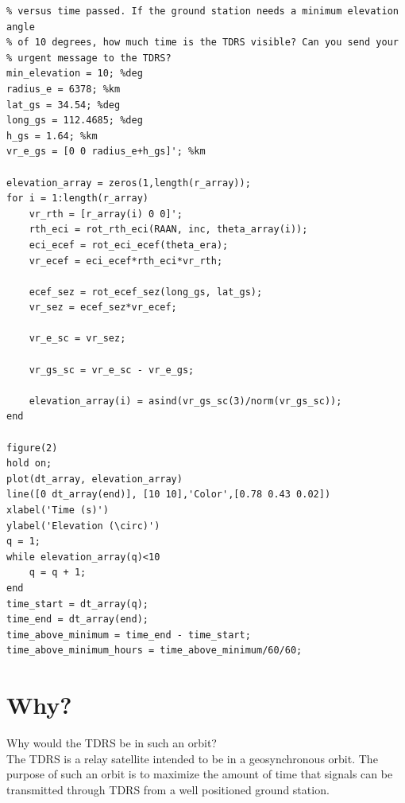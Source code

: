 \documentclass[hidelinks,12pt]{article}
\begin{document}
\begin{flushleft}
\vspace{5px}
\begin{lstlisting}[frame=lines,style=Matlab-editor,basicstyle = \mlttfamily]
% 6. Assume you have the ground station in Prescott. Plot the elevation angle
% versus time passed. If the ground station needs a minimum elevation angle
% of 10 degrees, how much time is the TDRS visible? Can you send your
% urgent message to the TDRS?
min_elevation = 10; %deg
radius_e = 6378; %km
lat_gs = 34.54; %deg
long_gs = 112.4685; %deg
h_gs = 1.64; %km
vr_e_gs = [0 0 radius_e+h_gs]'; %km

elevation_array = zeros(1,length(r_array));
for i = 1:length(r_array)
    vr_rth = [r_array(i) 0 0]';
    rth_eci = rot_rth_eci(RAAN, inc, theta_array(i));
    eci_ecef = rot_eci_ecef(theta_era);
    vr_ecef = eci_ecef*rth_eci*vr_rth;

    ecef_sez = rot_ecef_sez(long_gs, lat_gs);
    vr_sez = ecef_sez*vr_ecef;

    vr_e_sc = vr_sez;

    vr_gs_sc = vr_e_sc - vr_e_gs;

    elevation_array(i) = asind(vr_gs_sc(3)/norm(vr_gs_sc));
end

figure(2)
hold on;
plot(dt_array, elevation_array)
line([0 dt_array(end)], [10 10],'Color',[0.78 0.43 0.02])
xlabel('Time (s)')
ylabel('Elevation (\circ)')
q = 1;
while elevation_array(q)<10
    q = q + 1;
end
time_start = dt_array(q);
time_end = dt_array(end);
time_above_minimum = time_end - time_start;
time_above_minimum_hours = time_above_minimum/60/60;
\end{lstlisting}
\newpage
\section{Why?}
Why would the TDRS be in such an orbit?\\
\vspace{5px}
The TDRS is a relay satellite intended to be in a geosynchronous orbit. The purpose of such an orbit is to maximize the amount of time that signals can be transmitted through TDRS from a well positioned ground station.


\end{flushleft}
\newpage

\end{document}
